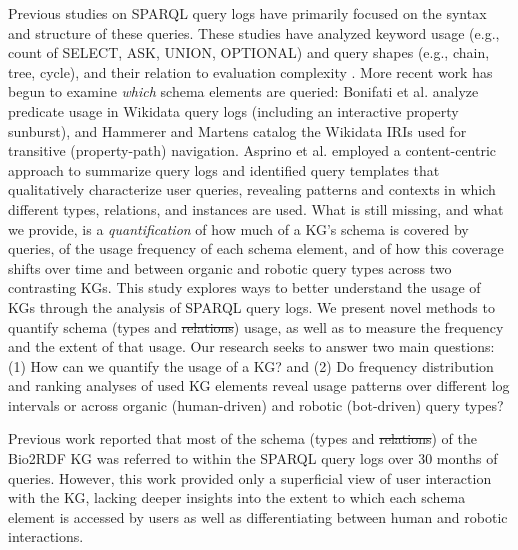 \documentclass[sw]{iosart2x}
\providecommand{\DIFadd}[1]{{\protect\color{blue}\uwave{#1}}} %
\providecommand{\DIFdel}[1]{{\protect\color{red}\sout{#1}}} %
\providecommand{\DIFaddbegin}{} %
\providecommand{\DIFaddend}{} %
\providecommand{\DIFdelbegin}{} %
\providecommand{\DIFdelend}{} %
\providecommand{\DIFscaledelfig}{0.5}
\newlength{\DIFdelgraphicswidth} %
\newlength{\DIFdelgraphicsheight} %
\providecommand{\DIFaddincludegraphics}[2][]{{\color{blue}\fbox{\DIFOincludegraphics[#1]{#2}}}} %
\providecommand{\DIFdelincludegraphics}[2][]{%
\sbox{\DIFdelgraphicsbox}{\DIFOincludegraphics[#1]{#2}}%
\settoboxwidth{\DIFdelgraphicswidth}{\DIFdelgraphicsbox} %
\settoboxtotalheight{\DIFdelgraphicsheight}{\DIFdelgraphicsbox} %
\scalebox{\DIFscaledelfig}{%
\parbox[b]{\DIFdelgraphicswidth}{\usebox{\DIFdelgraphicsbox}\\[-\baselineskip] \rule{\DIFdelgraphicswidth}{0em}}\llap{\resizebox{\DIFdelgraphicswidth}{\DIFdelgraphicsheight}{%
\setlength{\unitlength}{\DIFdelgraphicswidth}%
\begin{picture}(1,1)%
\thicklines\linethickness{2pt} %
{\color[rgb]{1,0,0}\put(0,0){\framebox(1,1){}}}%
{\color[rgb]{1,0,0}\put(0,0){\line( 1,1){1}}}%
{\color[rgb]{1,0,0}\put(0,1){\line(1,-1){1}}}%
\end{picture}%
}\hspace*{3pt}}} %
} %
\DeclareRobustCommand{\DIFaddbegin}{\DIFOaddbegin \let\includegraphics\DIFaddincludegraphics} %
\DeclareRobustCommand{\DIFaddend}{\DIFOaddend \let\includegraphics\DIFOincludegraphics} %
\DeclareRobustCommand{\DIFdelbegin}{\DIFOdelbegin \let\includegraphics\DIFdelincludegraphics} %
\DeclareRobustCommand{\DIFdelend}{\DIFOaddend \let\includegraphics\DIFOincludegraphics} %
\begin{document}
Previous studies on SPARQL query logs have primarily focused on the syntax and structure of these queries. These studies have analyzed keyword usage (e.g., count of SELECT, ASK, UNION, OPTIONAL) and query shapes (e.g., chain, tree, cycle), and their relation to evaluation complexity \cite{bonifati2020analytical, buil2015preliminary, saleem2015lsq,stadler2024lsq}. More recent work has begun to examine \emph{which} schema elements are queried: Bonifati et al. \cite{bonifati2019navigating} analyze predicate usage in Wikidata query logs (including an interactive property sunburst), and Hammerer and Martens \cite{hammerer2025compendium} catalog the Wikidata IRIs used for transitive (property-path) navigation. Asprino et al. \cite{asprino2023your} employed a content-centric approach to summarize query logs and identified query templates that qualitatively characterize user queries, revealing patterns and contexts in which different types, relations, and instances are used. What is still missing, and what we provide, is a \emph{quantification} of how much of a KG's schema is covered by queries, of the usage frequency of each schema element, and of how this coverage shifts over time and between organic and robotic query types across two contrasting KGs.
This study explores ways to better understand the usage of KGs through the analysis of SPARQL query logs. We present novel methods to quantify schema (types and \DIFdelbegin \DIFdel{relations}\DIFdelend \DIFaddbegin \DIFadd{predicates}\DIFaddend ) usage, as well as to measure the frequency and the extent of that usage. Our research seeks to answer two main questions: (1) How can we quantify the usage of a KG? and (2) Do frequency distribution and ranking analyses of used KG elements reveal usage patterns over different log intervals or across organic (human-driven) and robotic (bot-driven) query types?

Previous work \cite{mohammadi2024analyzing} reported that most of the schema (types and \DIFdelbegin \DIFdel{relations}\DIFdelend \DIFaddbegin \DIFadd{predicates}\DIFaddend ) of the Bio2RDF KG was referred to within the SPARQL query logs over 30 months of queries. However, this work provided only a superficial view of user interaction with the KG, lacking deeper insights into the extent to which each schema element is accessed by users as well as differentiating between human and robotic interactions. 
\end{document}
